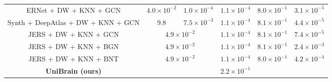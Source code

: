 \begin{table}[t]
{\begin{tabular}{ccccccc}
    ERNet +  
    DW +  
    KNN +
    GCN  &
    \multicolumn{2}{c}{$4.0 \times 10^{-2}$} &
    $1.0 \times 10^{-4}$ &
    $1.1 \times 10^{-4}$ &
    $8.0 \times 10^{-1}$ &
    $3.1 \times 10^{-5}$
    
    \\


    Synth + 
    DeepAtlas + 
    DW +  
    KNN +
    GCN  &
    9.8 &
    \multicolumn{2}{c}{$7.5 \times 10^{-3}$} &
    $1.1 \times 10^{-4}$ &
    $8.1 \times 10^{-1}$ &
    $4.4 \times 10^{-5}$ 

    \\

    JERS +
    DW +  
    KNN +
    GCN  &
    \multicolumn{3}{c}{$4.9 \times 10^{-2}$} &
    $1.1 \times 10^{-4}$ &
    $8.1 \times 10^{-1}$ &
    $7.4 \times 10^{-5}$ 

    \\

    JERS +
    DW +  
    KNN +
    BGN &
    \multicolumn{3}{c}{$4.9 \times 10^{-2}$} &
    $1.1 \times 10^{-4}$ &
    $8.1 \times 10^{-1}$ &
    $2.4 \times 10^{-3}$ 

    \\

    JERS +
    DW + 
    KNN +
    BNT   &
    \multicolumn{3}{c}{$4.9 \times 10^{-2}$} &
    $1.1 \times 10^{-4}$ &
    $8.0 \times 10^{-1}$ &
    $4.2 \times 10^{-4}$ 

    \\

    \midrule


    \textbf{UniBrain (ours)} & 
    \multicolumn{6}{c}{$2.2 \times 10^{-1}$} 
    
    \\

    \bottomrule  
    \end{tabular}
    }
    \vspace{-15pt}
\end{table}


